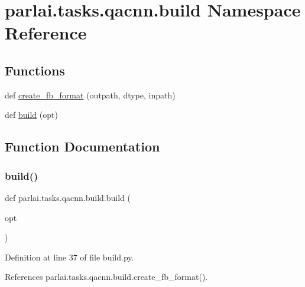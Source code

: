 \hypertarget{namespaceparlai_1_1tasks_1_1qacnn_1_1build}{}\section{parlai.\+tasks.\+qacnn.\+build Namespace Reference}
\label{namespaceparlai_1_1tasks_1_1qacnn_1_1build}
\subsection*{Functions}
\begin{DoxyCompactItemize}
\item 
def \hyperlink{namespaceparlai_1_1tasks_1_1qacnn_1_1build_add8d5f440ef973d77d8f63cc11197dce}{create\+\_\+fb\+\_\+format} (outpath, dtype, inpath)
\item 
def \hyperlink{namespaceparlai_1_1tasks_1_1qacnn_1_1build_a75d46e5e4248f77e7a6b83c7038144fa}{build} (opt)
\end{DoxyCompactItemize}


\subsection{Function Documentation}
\mbox{\label{namespaceparlai_1_1tasks_1_1qacnn_1_1build_a75d46e5e4248f77e7a6b83c7038144fa}} 
\subsubsection{\texorpdfstring{build()}{build()}}
{\footnotesize\ttfamily def parlai.\+tasks.\+qacnn.\+build.\+build (\begin{DoxyParamCaption}\item[{}]{opt }\end{DoxyParamCaption})}



Definition at line 37 of file build.\+py.



References parlai.\+tasks.\+qacnn.\+build.\+create\+\_\+fb\+\_\+format().

